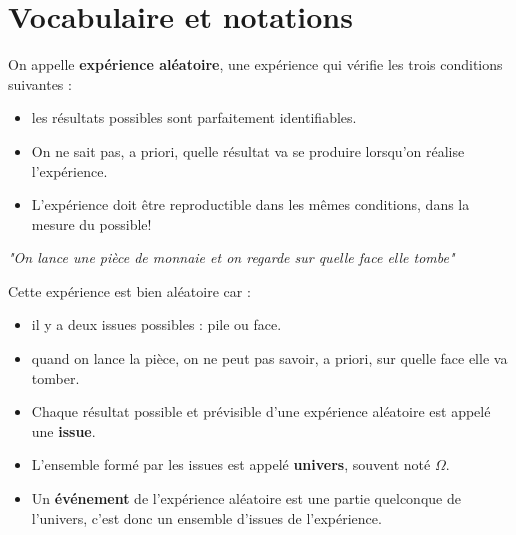 \section{Vocabulaire et notations}
\begin{definition}
On appelle \textbf{expérience aléatoire}, une expérience qui vérifie les trois conditions suivantes :
    \begin{itemize}
        \item les résultats possibles sont parfaitement identifiables.
        \item On ne sait pas, a priori, quelle résultat va se produire lorsqu'on réalise l'expérience.
        \item L'expérience doit être reproductible dans les mêmes conditions, dans la mesure du possible!
    \end{itemize}
\end{definition}

\begin{exemple*1}

    \textit{"On lance une pièce de monnaie et on regarde sur quelle face elle tombe"}

    Cette expérience est bien aléatoire car :
    \begin{itemize}
        \item il y a deux issues possibles : \og pile\fg{} ou \og face\fg{}.
        \item quand on lance la pièce, on ne peut pas savoir, a priori, sur quelle face elle va tomber.
    \end{itemize}
\end{exemple*1}

\begin{vocabulaire}
   \begin{itemize}
      \item Chaque résultat possible et prévisible d'une expérience aléatoire est appelé une \textbf{issue}.
      \item L'ensemble formé par les issues est appelé \textbf{univers}, souvent noté $\Omega$.
      \item Un \textbf{événement} de l'expérience aléatoire est une partie quelconque de l'univers, c'est donc un ensemble d'issues de l'expérience.
   \end{itemize}
\end{vocabulaire}

